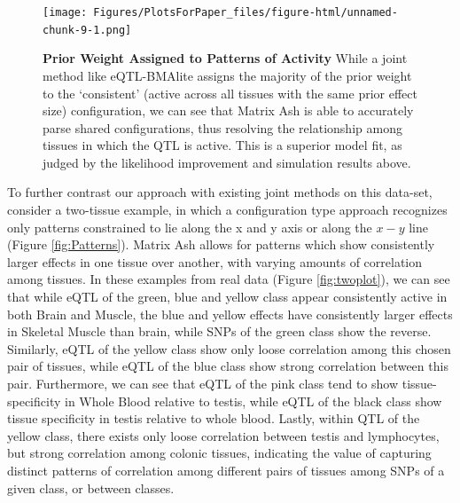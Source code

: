 \begin{figure}[htbp]
\texttt{[image: Figures/PlotsForPaper\_files/figure-html/unnamed-chunk-9-1.png]}
\caption{\textbf{Prior Weight Assigned to Patterns of Activity} While a joint method like eQTL-BMAlite assigns the majority of the prior weight to the `consistent' (active across all tissues with the same prior effect size) configuration, we can see that Matrix Ash is able to accurately parse shared configurations, thus resolving the relationship among tissues in which the QTL is active. This is a superior model fit, as judged by the likelihood improvement and simulation results above.}
\label{fig:pihat}
\end{figure}\newline


To further contrast our approach with existing joint methods on this data-set, consider a two-tissue example, in which a configuration type approach recognizes only patterns constrained to lie along the x and y axis or along the $x-y$ line (Figure \ref{fig:Patterns}). Matrix Ash allows for patterns which show consistently larger effects in one tissue over another, with varying amounts of correlation among tissues. In these examples from real data (Figure \ref{fig:twoplot}), we can see that while eQTL of the green, blue and yellow class appear consistently active in both Brain and Muscle, the blue and yellow effects have consistently larger effects in Skeletal Muscle than brain, while SNPs of the green class show the reverse. Similarly, eQTL of the yellow class show only loose correlation among this chosen pair of tissues, while eQTL of the blue class show strong correlation between this pair. Furthermore, we can see that eQTL of the pink class tend to show tissue-specificity in Whole Blood relative to testis, while eQTL of the black class show tissue specificity in testis relative to whole blood. Lastly, within QTL of the yellow class, there exists only loose correlation between testis and lymphocytes, but strong correlation among colonic tissues, indicating the value of capturing distinct patterns of correlation among different pairs of tissues among SNPs of a given class, or between classes. 



